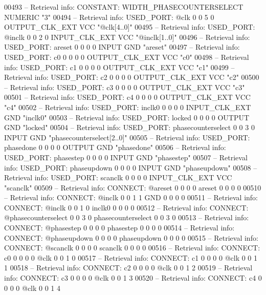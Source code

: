 \begin{DoxyCode}
{00493 \textcolor{keyword}{-- Retrieval info: CONSTANT: WIDTH\_PHASECOUNTERSELECT NUMERIC "3"}
00494 \textcolor{keyword}{-- Retrieval info: USED\_PORT: @clk 0 0 5 0 OUTPUT\_CLK\_EXT VCC "@clk[4..0]"}
00495 \textcolor{keyword}{-- Retrieval info: USED\_PORT: @inclk 0 0 2 0 INPUT\_CLK\_EXT VCC "@inclk[1..0]"}
00496 \textcolor{keyword}{-- Retrieval info: USED\_PORT: areset 0 0 0 0 INPUT GND "areset"}
00497 \textcolor{keyword}{-- Retrieval info: USED\_PORT: c0 0 0 0 0 OUTPUT\_CLK\_EXT VCC "c0"}
00498 \textcolor{keyword}{-- Retrieval info: USED\_PORT: c1 0 0 0 0 OUTPUT\_CLK\_EXT VCC "c1"}
00499 \textcolor{keyword}{-- Retrieval info: USED\_PORT: c2 0 0 0 0 OUTPUT\_CLK\_EXT VCC "c2"}
00500 \textcolor{keyword}{-- Retrieval info: USED\_PORT: c3 0 0 0 0 OUTPUT\_CLK\_EXT VCC "c3"}
00501 \textcolor{keyword}{-- Retrieval info: USED\_PORT: c4 0 0 0 0 OUTPUT\_CLK\_EXT VCC "c4"}
00502 \textcolor{keyword}{-- Retrieval info: USED\_PORT: inclk0 0 0 0 0 INPUT\_CLK\_EXT GND "inclk0"}
00503 \textcolor{keyword}{-- Retrieval info: USED\_PORT: locked 0 0 0 0 OUTPUT GND "locked"}
00504 \textcolor{keyword}{-- Retrieval info: USED\_PORT: phasecounterselect 0 0 3 0 INPUT GND "phasecounterselect[2..0]"}
00505 \textcolor{keyword}{-- Retrieval info: USED\_PORT: phasedone 0 0 0 0 OUTPUT GND "phasedone"}
00506 \textcolor{keyword}{-- Retrieval info: USED\_PORT: phasestep 0 0 0 0 INPUT GND "phasestep"}
00507 \textcolor{keyword}{-- Retrieval info: USED\_PORT: phaseupdown 0 0 0 0 INPUT GND "phaseupdown"}
00508 \textcolor{keyword}{-- Retrieval info: USED\_PORT: scanclk 0 0 0 0 INPUT\_CLK\_EXT VCC "scanclk"}
00509 \textcolor{keyword}{-- Retrieval info: CONNECT: @areset 0 0 0 0 areset 0 0 0 0}
00510 \textcolor{keyword}{-- Retrieval info: CONNECT: @inclk 0 0 1 1 GND 0 0 0 0}
00511 \textcolor{keyword}{-- Retrieval info: CONNECT: @inclk 0 0 1 0 inclk0 0 0 0 0}
00512 \textcolor{keyword}{-- Retrieval info: CONNECT: @phasecounterselect 0 0 3 0 phasecounterselect 0 0 3 0}
00513 \textcolor{keyword}{-- Retrieval info: CONNECT: @phasestep 0 0 0 0 phasestep 0 0 0 0}
00514 \textcolor{keyword}{-- Retrieval info: CONNECT: @phaseupdown 0 0 0 0 phaseupdown 0 0 0 0}
00515 \textcolor{keyword}{-- Retrieval info: CONNECT: @scanclk 0 0 0 0 scanclk 0 0 0 0}
00516 \textcolor{keyword}{-- Retrieval info: CONNECT: c0 0 0 0 0 @clk 0 0 1 0}
00517 \textcolor{keyword}{-- Retrieval info: CONNECT: c1 0 0 0 0 @clk 0 0 1 1}
00518 \textcolor{keyword}{-- Retrieval info: CONNECT: c2 0 0 0 0 @clk 0 0 1 2}
00519 \textcolor{keyword}{-- Retrieval info: CONNECT: c3 0 0 0 0 @clk 0 0 1 3}
00520 \textcolor{keyword}{-- Retrieval info: CONNECT: c4 0 0 0 0 @clk 0 0 1 4}
}
\end{DoxyCode}
